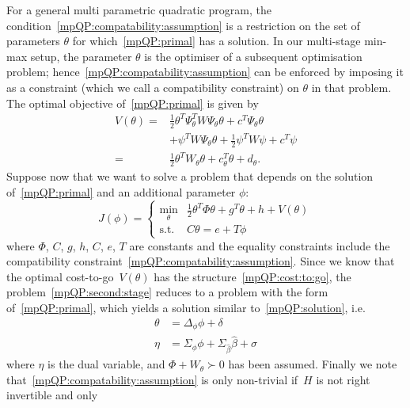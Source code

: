 %
For a general multi parametric quadratic program, the condition~\eqref{mpQP:compatability:assumption} is a restriction on the set of parameters $\theta$ for which~\eqref{mpQP:primal} has a solution.
%
In our multi-stage min-max setup, the parameter $\theta$ is the optimiser of a subsequent optimisation
problem; hence~\eqref{mpQP:compatability:assumption} can be enforced by imposing it as a constraint (which we call a compatibility constraint) on $\theta$ in that problem.
%
The optimal objective of~\eqref{mpQP:primal} is given by
%
\begin{equation}\label{mpQP:cost:to:go}\begin{split}
	V(\theta) = &\frac{1}{2}\theta^T \Psi_\theta^T W \Psi_\theta \theta + c^T\Psi_\theta \theta \\
& + \psi^TW\Psi_\theta \theta+\frac{1}{2}\psi^T W\psi + c^T\psi\\
=&\frac{1}{2} \theta^T W_\theta \theta + c^T_\theta \theta + d_\theta.
\end{split}\end{equation}
%
Suppose now that we want to solve a problem that depends on the solution of~\eqref{mpQP:primal} and an additional parameter $\phi$:
%
\begin{equation}\label{mpQP:second:stage} 
	J(\phi) = \left\{\begin{array}{rl}
	\min_\theta & \frac{1}{2}\theta^T\Phi\theta + g^T\theta + h + V(\theta)\\
	\text{s.t.} & C\theta = e+T\phi
	\end{array}\right.
\end{equation}
%
where $\Phi$, $C$, $g$, $h$, $C$, $e$, $T$ are constants and the equality constraints include the compatibility constraint~\eqref{mpQP:compatability:assumption}. 
%
Since we know that the optimal cost-to-go~$V(\theta)$ has the structure~\eqref{mpQP:cost:to:go}, the problem~\eqref{mpQP:second:stage} reduces to a problem with the form of~\eqref{mpQP:primal}, which yields a solution similar to~\eqref{mpQP:solution}, i.e.
\begin{equation}\label{mpQp:solution:second:stage}
\begin{split}
	\theta &= \Delta_\phi \phi + \delta\\
	\eta &= \Sigma_\phi \phi + \Sigma_{\hat\beta} \hat\beta + \sigma
\end{split}
\end{equation}
%
where $\eta$ is the dual variable, and $\Phi+W_\theta\succ 0$ has been assumed. 
%
Finally we note that~\eqref{mpQP:compatability:assumption} is only non-trivial if~$H$ is not right invertible and only 
